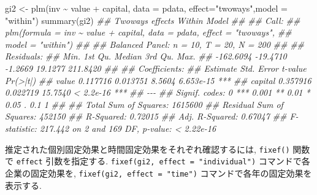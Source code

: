 \documentclass[
  letterpaper,
  xelatex,
  ja=standard, xelatex]{bxjsbook}
\newenvironment{Shaded}{\begin{snugshade}}{\end{snugshade}}
\newcommand{\AttributeTok}[1]{\textcolor[rgb]{0.40,0.45,0.13}{#1}}
\newcommand{\DocumentationTok}[1]{\textcolor[rgb]{0.37,0.37,0.37}{\textit{#1}}}
\newcommand{\FunctionTok}[1]{\textcolor[rgb]{0.28,0.35,0.67}{#1}}
\newcommand{\NormalTok}[1]{\textcolor[rgb]{0.00,0.23,0.31}{#1}}
\newcommand{\OtherTok}[1]{\textcolor[rgb]{0.00,0.23,0.31}{#1}}
\newcommand{\SpecialCharTok}[1]{\textcolor[rgb]{0.37,0.37,0.37}{#1}}
\newcommand{\StringTok}[1]{\textcolor[rgb]{0.13,0.47,0.30}{#1}}
\begin{document}
\begin{Shaded}
\begin{Highlighting}[]
\NormalTok{gi2 }\OtherTok{\textless{}{-}} \FunctionTok{plm}\NormalTok{(inv }\SpecialCharTok{\textasciitilde{}}\NormalTok{ value }\SpecialCharTok{+}\NormalTok{ capital, }\AttributeTok{data =}\NormalTok{ pdata, }\AttributeTok{effect=}\StringTok{"twoways"}\NormalTok{,}\AttributeTok{model =} \StringTok{"within"}\NormalTok{)}
\FunctionTok{summary}\NormalTok{(gi2)}
\DocumentationTok{\#\# Twoways effects Within Model}
\DocumentationTok{\#\# }
\DocumentationTok{\#\# Call:}
\DocumentationTok{\#\# plm(formula = inv \textasciitilde{} value + capital, data = pdata, effect = "twoways", }
\DocumentationTok{\#\#     model = "within")}
\DocumentationTok{\#\# }
\DocumentationTok{\#\# Balanced Panel: n = 10, T = 20, N = 200}
\DocumentationTok{\#\# }
\DocumentationTok{\#\# Residuals:}
\DocumentationTok{\#\#      Min.   1st Qu.    Median   3rd Qu.      Max. }
\DocumentationTok{\#\# {-}162.6094  {-}19.4710   {-}1.2669   19.1277  211.8420 }
\DocumentationTok{\#\# }
\DocumentationTok{\#\# Coefficients:}
\DocumentationTok{\#\#         Estimate Std. Error t{-}value  Pr(\textgreater{}|t|)    }
\DocumentationTok{\#\# value   0.117716   0.013751  8.5604 6.653e{-}15 ***}
\DocumentationTok{\#\# capital 0.357916   0.022719 15.7540 \textless{} 2.2e{-}16 ***}
\DocumentationTok{\#\# {-}{-}{-}}
\DocumentationTok{\#\# Signif. codes:  0 \textquotesingle{}***\textquotesingle{} 0.001 \textquotesingle{}**\textquotesingle{} 0.01 \textquotesingle{}*\textquotesingle{} 0.05 \textquotesingle{}.\textquotesingle{} 0.1 \textquotesingle{} \textquotesingle{} 1}
\DocumentationTok{\#\# }
\DocumentationTok{\#\# Total Sum of Squares:    1615600}
\DocumentationTok{\#\# Residual Sum of Squares: 452150}
\DocumentationTok{\#\# R{-}Squared:      0.72015}
\DocumentationTok{\#\# Adj. R{-}Squared: 0.67047}
\DocumentationTok{\#\# F{-}statistic: 217.442 on 2 and 169 DF, p{-}value: \textless{} 2.22e{-}16}
\end{Highlighting}
\end{Shaded}

推定された個別固定効果と時間固定効果をそれぞれ確認するには,
\texttt{fixef()} 関数で \texttt{effect} 引数を指定する.
\texttt{fixef(gi2,\ effect\ =\ "individual")}
コマンドで各企業の固定効果を, \texttt{fixef(gi2,\ effect\ =\ "time")}
コマンドで各年の固定効果を表示する.
\end{document}

